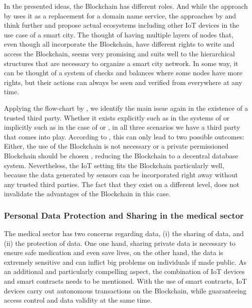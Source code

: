 In the presented ideas, the Blockchain has different roles. And while the approach by \cite{Rowan2017} uses it as a replacement for a domain name service, the approaches by \cite{DorriSteger2017} and \cite{Sharma2017} think further and propose actual ecosystems including other IoT devices in the use case of a smart city.
The thought of having multiple layers of nodes that, even though all incorporate the Blockchain, have different rights to write and access the Blockchain, seems very promising and suits well to the hierarchical structures that are necessary to organize a smart city network. In some way, it can be thought of a system of checks and balances where some nodes have more rights, but their actions can always be seen and verified from everywhere at any time.

Applying the flow-chart by \cite{Wust2017}, we identify the main issue again in the existence of a trusted third party. Whether it exists explicitly such as in the systems of \cite{Sharma2017} or implicitly such as in the case of \cite{Rowan2017} or \cite{DorriSteger2017}, in all three scenarios we have a third party that comes into play. 
According to \cite{Wust2017}, this can only lead to two possible outcomes: Either, the use of the Blockchain is not necessary or a private permissioned Blockchain should be chosen \cite{Wust2017}, reducing the Blockchain to a decentral database system.
Nevertheless, the IoT setting fits the Blockchain particularly well, because the data generated by sensors can be incorporated right away without any trusted third parties. The fact that they exist on a different level, does not invalidate the advantages of the Blockchain in this case.

\subsubsection{Personal Data Protection and Sharing in the medical sector}
The medical sector has two concerns regarding data, (i) the sharing of data, and (ii) the protection of data. One one hand, sharing private data is necessary to ensure safe medication and even save lives, on the other hand, the data is extremely sensitive and can inflict big problems on individuals if made public.
As an additional and particularly compelling aspect, the combination of IoT devices and smart contracts needs to be mentioned. With the use of smart contracts, IoT devices carry out autonomous transactions on the Blockchain, while guaranteeing access control and data validity at the same time.

